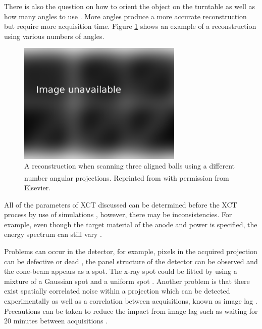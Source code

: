 There is also the question on how to orient the object on the turntable \citep{corcoran2016observations} as well as how many angles to use \citep{kruth2011computed}. More angles produce a more accurate reconstruction but require more acquisition time. Figure \ref{fig:literature_angles} shows an example of a reconstruction using various numbers of angles.

\begin{figure}
  \centering
  \includegraphics[width=0.7\textwidth]{../figures/literatureReview/literature_angles.png}
  \caption{A reconstruction when scanning three aligned balls using a different number angular projections. Reprinted from \cite{kruth2011computed}\textsuperscript{\textcopyright} with permission from Elsevier.}
  \label{fig:literature_angles}
\end{figure}

All of the parameters of XCT discussed can be determined before the XCT process by use of simulations \citep{reisinger2011simulation, reiter2011simulation}, however, there may be inconsistencies. For example, even though the target material of the anode and power is specified, the energy spectrum can still vary \citep{stumbo2004direct}.

Problems can occur in the detector, for example, pixels in the acquired projection can be defective or dead \citep{brettschneider2014spatial}, the panel structure of the detector can be observed \citep{yang2009evaluation} and the cone-beam appears as a spot. The x-ray spot could be fitted by using a mixture of a Gaussian spot and a uniform spot \citep{kueh2016modelling}. Another problem is that there exist spatially correlated noise within a projection which can be detected experimentally \citep{sun2016characterisation} as well as a correlation between acquisitions, known as image lag \citep{yang2009evaluation}. Precautions can be taken to reduce the impact from image lag such as waiting for 20 minutes between acquisitions \citep{yang2010noise}.

